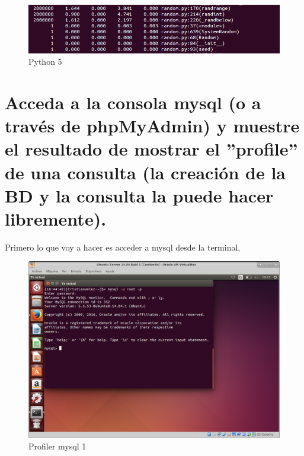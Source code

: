 \begin{figure}[H] %
	\centering
	\includegraphics[scale=0.35]{pics/python5.png}  %
	\caption{Python 5} \label{fig:python5}
\end{figure}





\section[Cuestión 9]{   Acceda a la consola mysql (o a través de phpMyAdmin) y	muestre el resultado de mostrar el ”profile” de una consulta (la creación de la BD y la consulta la puede hacer libremente).}

Primero lo que voy a hacer es acceder a mysql \cite{mysql} desde la terminal, 

\begin{figure}[H] %
	\centering
	\includegraphics[scale=0.35]{pics/profile1.png}  %
	\caption{Profiler mysql 1} \label{fig:p1}
\end{figure}

